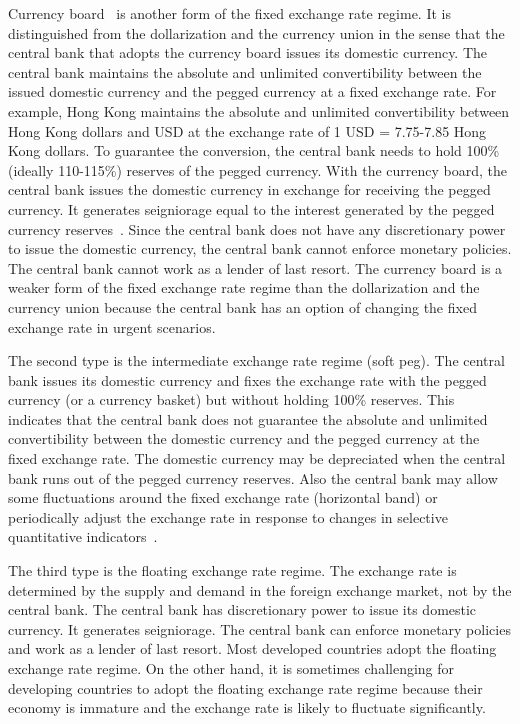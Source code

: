 \documentclass[dvipdfmx,a4paper]{article}
\begin{document}
Currency board~\cite{fabris2013efficiency} is another form of the fixed exchange rate regime. It is distinguished from the dollarization and the currency union in the sense that the central bank that adopts the currency board issues its domestic currency. The central bank maintains the absolute and unlimited convertibility between the issued domestic currency and the pegged currency at a fixed exchange rate. For example, Hong Kong maintains the absolute and unlimited convertibility between Hong Kong dollars and USD at the exchange rate of 1 USD = 7.75-7.85 Hong Kong dollars. To guarantee the conversion, the central bank needs to hold 100\% (ideally 110-115\%) reserves of the pegged currency. With the currency board, the central bank issues the domestic currency in exchange for receiving the pegged currency. It generates seigniorage equal to the interest generated by the pegged currency reserves~\cite{selgin2005currency}. Since the central bank does not have any discretionary power to issue the domestic currency, the central bank cannot enforce monetary policies. The central bank cannot work as a lender of last resort. The currency board is a weaker form of the fixed exchange rate regime than the dollarization and the currency union because the central bank has an option of changing the fixed exchange rate in urgent scenarios.

The second type is the intermediate exchange rate regime (soft peg). The central bank issues its domestic currency and fixes the exchange rate with the pegged currency (or a currency basket) but without holding 100\% reserves. This indicates that the central bank does not guarantee the absolute and unlimited convertibility between the domestic currency and the pegged currency at the fixed exchange rate. The domestic currency may be depreciated when the central bank runs out of the pegged currency reserves. Also the central bank may allow some fluctuations around the fixed exchange rate (horizontal band) or periodically adjust the exchange rate in response to changes in selective quantitative indicators~\cite{imfreport}.

The third type is the floating exchange rate regime. The exchange rate is determined by the supply and demand in the foreign exchange market, not by the central bank. The central bank has discretionary power to issue its domestic currency. It generates seigniorage. The central bank can enforce monetary policies and work as a lender of last resort. Most developed countries adopt the floating exchange rate regime. On the other hand, it is sometimes challenging for developing countries to adopt the floating exchange rate regime because their economy is immature and the exchange rate is likely to fluctuate significantly.
\end{document}
